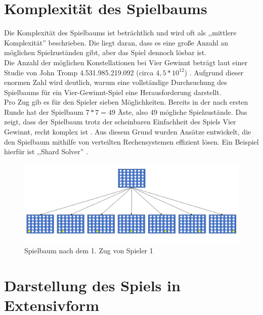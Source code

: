 \section{Komplexität des Spielbaums}
Die Komplexität des Spielbaums ist beträchtlich und wird oft als ,,mittlere Komplexität'' beschrieben. Die liegt daran, dass es eine große Anzahl an möglichen Spielzuständen gibt, aber das Spiel dennoch lösbar ist.\\
Die Anzahl der möglichen Konstellationen bei Vier Gewinnt beträgt laut einer Studie von John Tromp 4.531.985.219.092 (circa $4,5*10^{12}$) \autocite{thill2012reinforcement}. Aufgrund dieser enormen Zahl wird deutlich, warum eine vollständige Durchsuchung des Spielbaums für ein Vier-Gewinnt-Spiel eine Herausforderung darstellt.\\
Pro Zug gib es für den Spieler sieben Möglichkeiten. Bereits in der nach ersten Runde hat der Spielbaum $7*7 = 49$ Äste, also 49 mögliche Spielzustände. Das zeigt, dass der Spielbaum trotz der scheinbaren Einfachheit des Spiels Vier Gewinnt, recht komplex ist \autocite{thill2012reinforcement}\autocite{ruile2009viergewinnt}. Aus diesem Grund wurden Ansätze entwickelt, die den Spielbaum mithilfe von verteilten Rechensystemen effizient lösen. Ein Beispiel hierfür ist ,,Shard Solver'' \autocite{yokota2022exploration}.



\begin{figure}[H]
	\centering
	\includegraphics[width=0.9\linewidth]{"images/Baum1"}
	\caption[Spielbaum nach der 2. Tiefe]{Spielbaum nach dem 1. Zug von Spieler 1}
	\label{fig:baum1}
\end{figure}





 \section{Darstellung des Spiels in Extensivform}

